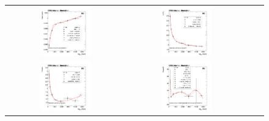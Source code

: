 \begin{figure}[ht]
  \begin{center}
    \begin{tabular}{cccc}
      \includegraphics[width=0.45\textwidth]{figures/Zprime/2017/mass_resolution/High_Mass/BE_mean} &
      \includegraphics[width=0.45\textwidth]{figures/Zprime/2017/mass_resolution/High_Mass/BE_sigma}\\
      \includegraphics[width=0.45\textwidth]{figures/Zprime/2017/mass_resolution/High_Mass/BE_PowerL} &
      \includegraphics[width=0.45\textwidth]{figures/Zprime/2017/mass_resolution/High_Mass/BE_PowerR} \\

\end{tabular}
\end{center}
\end{figure}
